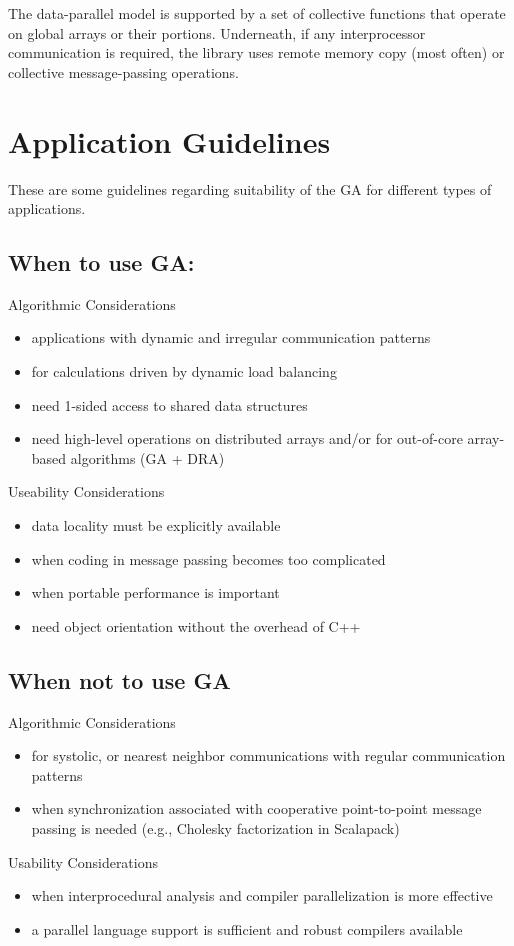The data-parallel model is supported by a set of collective functions that
operate on global arrays or their portions. Underneath, if any interprocessor
communication is required, the library uses remote memory copy (most often) or
collective message-passing operations. 

\section{Application Guidelines}

These are some guidelines regarding suitability of the GA for different types
of applications. 

\subsection{When to use GA: }

Algorithmic Considerations 
\begin{itemize}
\item applications with dynamic and irregular communication patterns 
\item for calculations driven by dynamic load balancing 
\item need 1-sided access to shared data structures 
\item need high-level operations on distributed arrays and/or for out-of-core
array-based algorithms (GA + DRA) 
\end{itemize}
Useability Considerations
\begin{itemize}
\item data locality must be explicitly available 
\item when coding in message passing becomes too complicated 
\item when portable performance is important 
\item need object orientation without the overhead of C++ 
\end{itemize}

\subsection{When not to use GA}

Algorithmic Considerations 
\begin{itemize}
\item for systolic, or nearest neighbor communications with regular
communication patterns 
\item when synchronization associated with cooperative point-to-point message
passing is needed (e.g., Cholesky factorization in Scalapack) 
\end{itemize}
Usability Considerations 
\begin{itemize}
\item when interprocedural analysis and compiler parallelization is more
effective 
\item a parallel language support is sufficient and robust compilers available 
\end{itemize}
